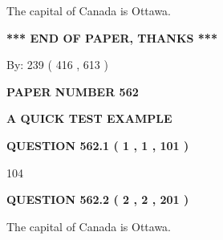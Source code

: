 \documentclass[12pt]{article}
\begin{document}
 
\noindent{}
 
 
The capital of Canada is Ottawa.
 
 
 
 
   
   
 \vspace{0.2in}
 
   
   
   
   
\vspace{1.0in} 
{\textbf{\large{ *** END OF PAPER, THANKS *** }}} 
   
   
\hspace{1.0in} By: 
 239 ( 416 ,  613 )
   
   
   
   
\newpage 
\setcounter{page}{ 
   562001 } 
   
   
   
   
 {\textbf{ \Large{ PAPER NUMBER  562  }}}
   
   
\vspace{0.2in}
   
   
   
   
   
   
 \vspace{0.2in}
{\LARGE {\textbf{ A QUICK TEST EXAMPLE}}}
   
   
  
\vspace{0.2in}
  
{\textbf{\Large{QUESTION
562.1 
 ( 1 , 1 , 101 )
}}}
  
  
 
 
\noindent{}

104
 
 
  
\vspace{0.2in}
  
{\textbf{\Large{QUESTION
562.2 
 ( 2 , 2 , 201 )
}}}
  
  
 
 
\noindent{}
 
 
The capital of Canada is Ottawa.
 
 
 
\end{document}

